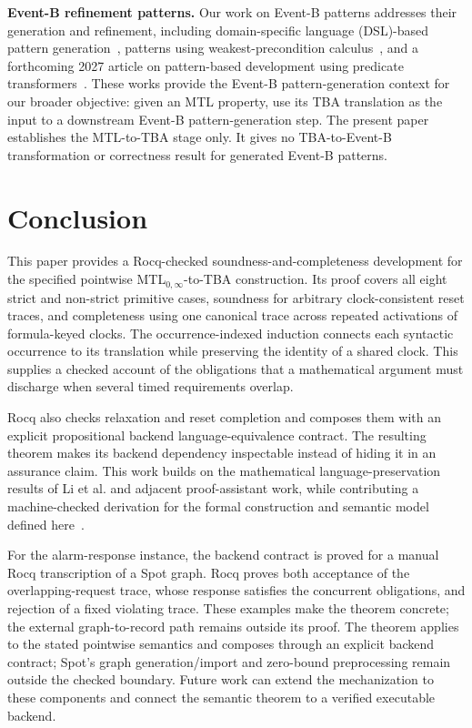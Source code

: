 \documentclass{ieeeaccess}
\newcommand{\runinhead}[1]{\par\noindent\textbf{#1}\enspace}
\begin{document}
\runinhead{Event-B refinement patterns.}
Our work on Event-B patterns addresses their generation and refinement,
including domain-specific language (DSL)-based pattern generation~\cite{fares_abz23}, patterns using
weakest-precondition calculus~\cite{fares_facs24}, and a forthcoming 2027
article on pattern-based development using predicate transformers~\cite{fares_scp27}. These works
provide the Event-B pattern-generation context for our broader objective:
given an MTL property, use its TBA translation as the input to a downstream
Event-B pattern-generation step. The present paper establishes the MTL-to-TBA
stage only. It gives no TBA-to-Event-B transformation or correctness result
for generated Event-B patterns.

\section{Conclusion}
This paper provides a Rocq-checked soundness-and-completeness development for
the specified pointwise MTL$_{0,\infty}$-to-TBA construction. Its proof covers
all eight strict and non-strict primitive cases, soundness for arbitrary
clock-consistent reset traces, and completeness using one canonical trace
across repeated activations of formula-keyed clocks. The occurrence-indexed
induction connects each syntactic occurrence to its translation while
preserving the identity of a shared clock. This supplies a checked account of
the obligations that a mathematical argument must discharge when several
timed requirements overlap.

Rocq also checks relaxation and reset completion and composes them with an
explicit propositional backend language-equivalence contract. The resulting
theorem makes its backend dependency inspectable instead of hiding it in an
assurance claim. This work builds on the mathematical language-preservation
results of Li et al. and adjacent proof-assistant work, while contributing a
machine-checked derivation for the formal construction and semantic model
defined here~\cite{li_spin7,xu08,roohi_viswanathan_vmcai18}.

For the alarm-response instance, the backend contract is proved for a manual
Rocq transcription of a Spot graph. Rocq proves both acceptance of the
overlapping-request trace, whose response satisfies the concurrent
obligations, and rejection of a fixed violating trace. These examples make
the theorem concrete; the external graph-to-record path remains outside its
proof. The theorem applies to the stated pointwise semantics and composes
through an explicit backend contract; Spot's graph generation/import and
zero-bound preprocessing remain outside the checked boundary. Future work
can extend the mechanization to these components and connect the semantic
theorem to a verified executable backend.
\end{document}
